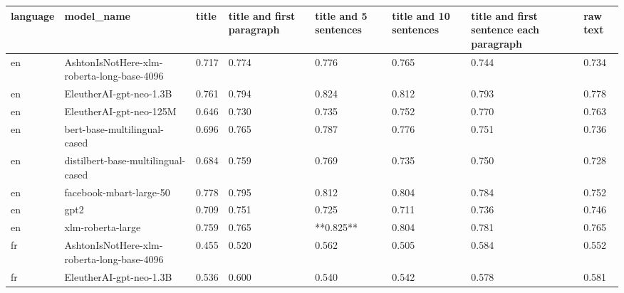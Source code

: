 \begin{tabular}{llllllll}
\toprule
language &                                 model\_name & title & title and first paragraph & title and 5 sentences & title and 10 sentences & title and first sentence each paragraph & raw text \\
\midrule
      en & AshtonIsNotHere-xlm-roberta-long-base-4096 & 0.717 &                     0.774 &                 0.776 &                  0.765 &                                   0.744 &    0.734 \\
      en &                    EleutherAI-gpt-neo-1.3B & 0.761 &                     0.794 &                 0.824 &                  0.812 &                                   0.793 &    0.778 \\
      en &                    EleutherAI-gpt-neo-125M & 0.646 &                     0.730 &                 0.735 &                  0.752 &                                   0.770 &    0.763 \\
      en &               bert-base-multilingual-cased & 0.696 &                     0.765 &                 0.787 &                  0.776 &                                   0.751 &    0.736 \\
      en &         distilbert-base-multilingual-cased & 0.684 &                     0.759 &                 0.769 &                  0.735 &                                   0.750 &    0.728 \\
      en &                    facebook-mbart-large-50 & 0.778 &                     0.795 &                 0.812 &                  0.804 &                                   0.784 &    0.752 \\
      en &                                       gpt2 & 0.709 &                     0.751 &                 0.725 &                  0.711 &                                   0.736 &    0.746 \\
      en &                          xlm-roberta-large & 0.759 &                     0.765 &             **0.825** &                  0.804 &                                   0.781 &    0.765 \\
      fr & AshtonIsNotHere-xlm-roberta-long-base-4096 & 0.455 &                     0.520 &                 0.562 &                  0.505 &                                   0.584 &    0.552 \\
      fr &                    EleutherAI-gpt-neo-1.3B & 0.536 &                     0.600 &                 0.540 &                  0.542 &                                   0.578 &    0.581 \\

\end{tabular}

